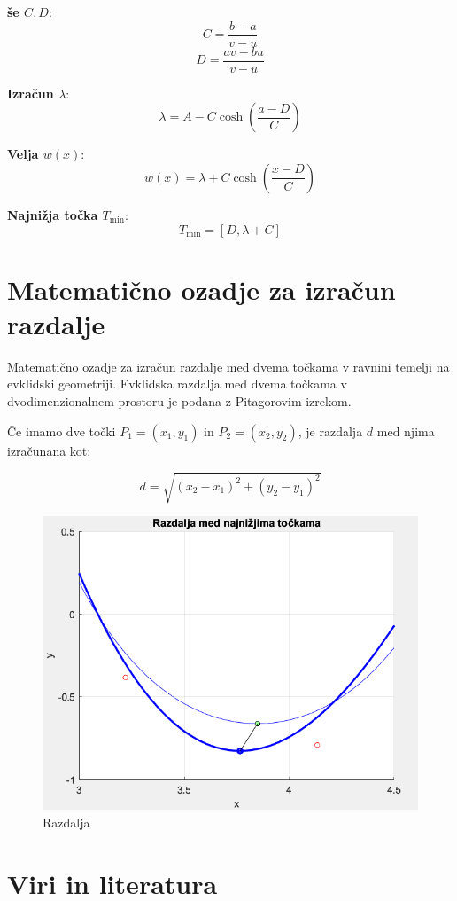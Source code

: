 \documentclass{article}
\begin{document}
        \textbf{še \( C, D \)}:
        \[
        C = \frac{b - a}{v - u}
        \]
        \[
        D = \frac{a v - b u}{v - u}
        \]
    
        \textbf{Izračun \(\lambda\)}:
        \[
        \lambda = A - C \cosh\left(\frac{a - D}{C}\right)
        \]
    
        \textbf{Velja \( w(x) \)}:
        \[
        w(x) = \lambda + C \cosh\left(\frac{x - D}{C}\right)
        \]
    
        \textbf{Najnižja točka \( T_{\text{min}} \)}:
        \[
        T_{\text{min}} = [D, \lambda + C]
        \]

        \section*{Matematično ozadje za izračun razdalje}

        Matematično ozadje za izračun razdalje med dvema točkama v ravnini temelji na evklidski geometriji. Evklidska razdalja med dvema točkama v dvodimenzionalnem prostoru je podana z Pitagorovim izrekom.
        
        Če imamo dve točki \( P_1 = (x_1, y_1) \) in \( P_2 = (x_2, y_2) \), je razdalja \( d \) med njima izračunana kot:
        
        \[
        d = \sqrt{(x_2 - x_1)^2 + (y_2 - y_1)^2}
        \]
        
        \begin{figure}[H]
            \centering
            \includegraphics[width=0.8\linewidth]{razdalja.png}
            \caption{Razdalja}
            \label{fig:enter-label}
        \end{figure}

	\section{Viri in literatura}
        	
\end{document}
